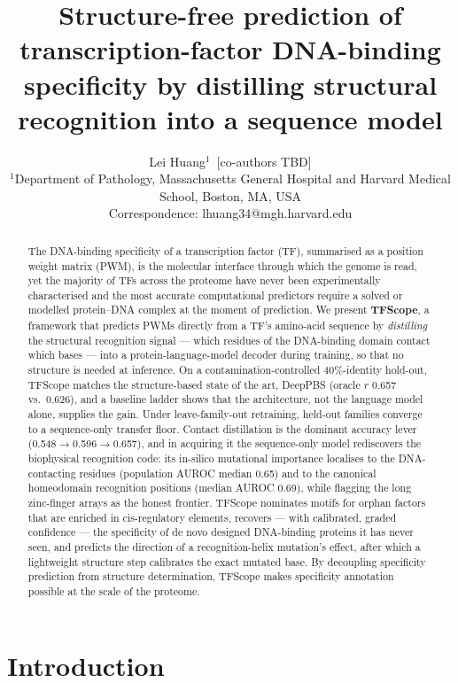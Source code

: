 \documentclass[11pt,letterpaper]{article}
\title{\textbf{Structure-free prediction of transcription-factor DNA-binding
specificity by distilling structural recognition into a sequence model}}
\author{
  Lei Huang$^{1}$~[co-authors TBD]\\[6pt]
  \small $^1$Department of Pathology, Massachusetts General Hospital and Harvard Medical School, Boston, MA, USA\\
  \small Correspondence: lhuang34@mgh.harvard.edu
}
\date{}
\begin{document}
\maketitle

\begin{abstract}
\noindent
The DNA-binding specificity of a transcription factor (TF), summarised as a position weight
matrix (PWM), is the molecular interface through which the genome is read, yet the majority of
TFs across the proteome have never been experimentally characterised and the most accurate
computational predictors require a solved or modelled protein--DNA complex at the moment of
prediction. We present \textbf{TFScope}, a framework that predicts PWMs directly from a TF's
amino-acid sequence by \emph{distilling} the structural recognition signal --- which
residues of the DNA-binding domain contact which bases --- into a protein-language-model decoder
during training, so that no structure is needed at inference. On a contamination-controlled
40\%-identity hold-out, TFScope matches the structure-based state of the art, DeepPBS (oracle
$r$ 0.657 vs.\ 0.626), and a baseline ladder shows that the architecture, not the language model
alone, supplies the gain. Under leave-family-out retraining, held-out families converge to a
 sequence-only transfer floor. Contact distillation is the dominant accuracy lever
(0.548$\to$0.596$\to$0.657), and in acquiring it the sequence-only model rediscovers the
biophysical recognition code: its in-silico mutational importance localises to the
DNA-contacting residues (population AUROC median 0.65) and to the canonical homeodomain
recognition positions (median AUROC 0.69), while flagging the long zinc-finger arrays as the
honest frontier. TFScope nominates motifs for orphan factors that are enriched in
cis-regulatory elements, recovers --- with calibrated, graded confidence --- the specificity of
de novo designed DNA-binding proteins it has never seen, and predicts the direction of a
recognition-helix mutation's effect, after which a lightweight structure step calibrates the
exact mutated base. By decoupling specificity prediction from structure determination, TFScope
makes specificity annotation possible at the scale of the proteome.
\end{abstract}

\section*{Introduction}
\end{document}

